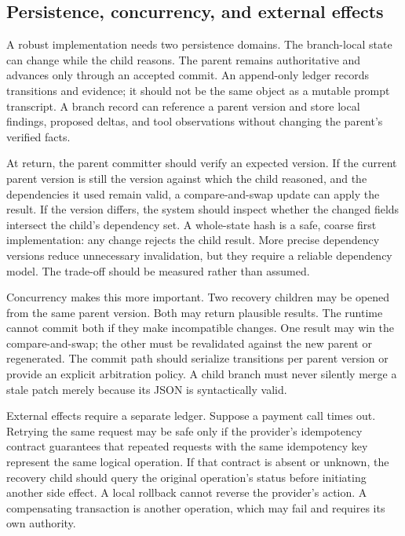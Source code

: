 \subsection{Persistence, concurrency, and external effects}
\label{subsec:ch13-persistence}

A robust implementation needs two persistence domains. The branch-local state can change while the child reasons. The parent remains authoritative and advances only through an accepted commit. An append-only ledger records transitions and evidence; it should not be the same object as a mutable prompt transcript. A branch record can reference a parent version and store local findings, proposed deltas, and tool observations without changing the parent's verified facts.

At return, the parent committer should verify an expected version. If the current parent version is still the version against which the child reasoned, and the dependencies it used remain valid, a compare-and-swap update can apply the result. If the version differs, the system should inspect whether the changed fields intersect the child's dependency set. A whole-state hash is a safe, coarse first implementation: any change rejects the child result. More precise dependency versions reduce unnecessary invalidation, but they require a reliable dependency model. The trade-off should be measured rather than assumed.

Concurrency makes this more important. Two recovery children may be opened from the same parent version. Both may return plausible results. The runtime cannot commit both if they make incompatible changes. One result may win the compare-and-swap; the other must be revalidated against the new parent or regenerated. The commit path should serialize transitions per parent version or provide an explicit arbitration policy. A child branch must never silently merge a stale patch merely because its JSON is syntactically valid.

External effects require a separate ledger. Suppose a payment call times out. Retrying the same request may be safe only if the provider's idempotency contract guarantees that repeated requests with the same idempotency key represent the same logical operation. If that contract is absent or unknown, the recovery child should query the original operation's status before initiating another side effect. A local rollback cannot reverse the provider's action. A compensating transaction is another operation, which may fail and requires its own authority.

